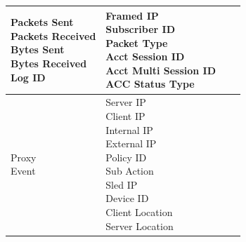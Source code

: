 \begin{description}
\begin{longtable}{p{}|p{}|p{}|p{}}
{                                                                                    Packets Sent\\
                                                                                    Packets Received\\
                                                                                    Bytes Sent\\
                                                                                    Bytes Received\\
                                                                                    Log ID}  & \tabincell{l}{Framed IP\\
                                                                                                            Subscriber ID\\
                                                                                                            Packet Type\\
                                                                                                            Acct Session ID\\
                                                                                                            Acct Multi Session ID\\
                                                                                                            ACC Status Type}    \\ \hline 
        \tabincell{l}{Proxy\\ Event} & \tabincell{l}{Server IP\\
                                                    Client IP\\
                                                    Internal IP\\
                                                    External IP\\
                                                    Policy ID\\
                                                    Sub Action\\
                                                    Sled IP\\
                                                    Device ID\\
                                                    Client Location\\
                                                    Server Location\\
}
\end{longtable}
\end{description}

